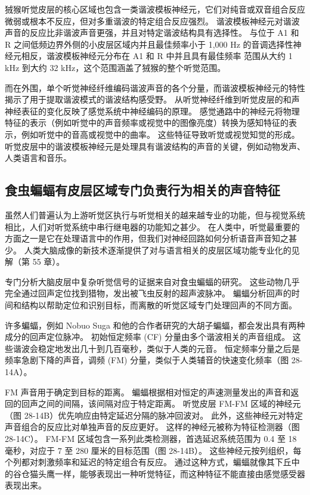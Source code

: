 狨猴听觉皮层的核心区域也包含一类谐波模板神经元，它们对纯音或双音组合反应微弱或根本不反应，但对多重谐波的特定组合反应强烈。 谐波模板神经元对谐波声音的反应比非谐波声音更强，并且对特定谐波结构具有选择性。 与位于 A1 和 R 之间低频边界外侧的小皮层区域内并且最佳频率小于 1,000 Hz 的音调选择性神经元相反，谐波模板神经元分布在 A1 和 R 中并且具有最佳频率 范围从大约 1 kHz 到大约 32 kHz，这个范围涵盖了狨猴的整个听觉范围。

而在外围，单个听觉神经纤维编码谐波声音的各个分量，而谐波模板神经元的特性揭示了用于提取谐波模式的谐波结构感受野。 从听觉神经纤维到听觉皮层的和声神经表征的变化反映了感觉系统中神经编码的原理。 感觉通路中的神经元将物理特征的表示（例如听觉中的声音频率或视觉中的图像亮度）转换为感知特征的表示，例如听觉中的音高或视觉中的曲率。 这些特征导致听觉或视觉知觉的形成。 听觉皮层中的谐波模板神经元是处理具有谐波结构的声音的关键，例如动物发声、人类语言和音乐。


\subsection{食虫蝙蝠有皮层区域专门负责行为相关的声音特征}
虽然人们普遍认为上游听觉区执行与听觉相关的越来越专业的功能，但与视觉系统相比，人们对听觉系统中串行继电器的功能知之甚少。 在人类中，听觉最重要的方面之一是它在处理语言中的作用，但我们对神经回路如何分析语音声音知之甚少。 人类大脑成像的新技术逐渐提供了对与语言相关的皮层区域功能专业化的见解（第 55 章）。

专门分析大脑皮层中复杂听觉信号的证据来自对食虫蝙蝠的研究。 这些动物几乎完全通过回声定位找到猎物，发出被飞虫反射的超声波脉冲。 蝙蝠分析回声的时间和结构以帮助定位和识别目标，而离散的听觉区域专门处理回声的不同方面。

许多蝙蝠，例如 Nobuo Suga 和他的合作者研究的大胡子蝙蝠，都会发出具有两种成分的回声定位脉冲。 初始恒定频率 (CF) 分量由多个谐波相关的声音组成。 这些谐波会稳定地发出几十到几百毫秒，类似于人类的元音。 恒定频率分量之后是频率急剧下降的声音，调频 (FM) 分量，类似于人类辅音的快速变化频率（图 28-14A）。

FM 声音用于确定到目标的距离。 蝙蝠根据相对恒定的声速测量发出的声音和返回的回声之间的间隔，该间隔对应于特定距离。 听觉皮层 FM-FM 区域的神经元（图 28-14B）优先响应由特定延迟分隔的脉冲回波对。 此外，这些神经元对特定声音组合的反应比对单独声音的反应更好。 这样的神经元被称为特征检测器（图 28-14C）。 FM-FM 区域包含一系列此类检测器，首选延迟系统范围为 0.4 至 18 毫秒，对应于 7 至 280 厘米的目标范围（图 28-14B）。 这些神经元按列组织，每个列都对刺激频率和延迟的特定组合有反应。 通过这种方式，蝙蝠就像其下丘中的谷仓猫头鹰一样，能够表现出一种听觉特征，而这种特征不能直接由感觉感受器表现出来。

